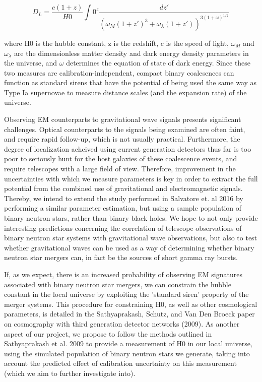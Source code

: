\documentclass{article}
\begin{document}
\begin{equation} D_L = \frac{c(1+z)}{H0}\int{0}^{z} \frac{dz'}{(\omega_M(1+z')^3 + \omega_{\lambda}(1+z'))^{3(1+\omega)^{1/2}}} \end{equation}

where H0 is the hubble constant, z is the redshift, c is the speed of light, $\omega_M$ and $\omega_{\lambda}$ are the dimensionless matter density and dark energy density parameters in the universe, and $\omega$ determines the equation of state of dark energy.  Since these two measures are calibration-independent, compact binary coalesences can function as standard sirens that have the potential of being used the same way as Type Ia supernovae to measure distance scales (and the expansion rate) of the universe.  

Observing EM counterparts to gravitational wave signals presents significant challenges.  Optical counterparts to the signals being examined are often faint, and require rapid follow-up, which is not usually practical.  Furthermore, the degree of localization acheived using current generation detectors thus far is too poor to seriously hunt for the host galaxies of these coalescence events, and require telescopes with a large field of view.  Therefore, improvement in the uncertainties with which we measure parameters is key in order to extract the full potential from the combined use of gravitational and electromagnetic signals. Thereby, we intend to extend the study performed in Salvatore et. al 2016 by performing a similar parameter estimation, but using a sample population of binary neutron stars, rather than binary black holes.  We hope to not only provide interesting predictions concerning the correlation of telescope observations of binary neutron star systems with gravitational wave observations, but also to test whether gravitational waves can be used as a way of determining whether binary neutron star mergers can, in fact be the sources of short gamma ray bursts.

If, as we expect, there is an increased probability of observing EM signatures associated with binary neutron star mergers, we can constrain the hubble constant in the local universe by exploiting the 'standard siren' property of the merger systems.  This procedure for constraining H0, as well as other cosmological parameters, is detailed in the Sathyaprakash, Schutz, and Van Den Broeck paper on cosmography with third generation detector networks (2009).  As another aspect of our project, we propose to follow the methods outlined in Sathyaprakash et al. 2009 to provide a measurement of H0 in our local universe, using the simulated population of binary neutron stars we generate, taking into account the predicted effect of calibration uncertainty on this measurement (which we aim to further investigate into).
\end{document}
